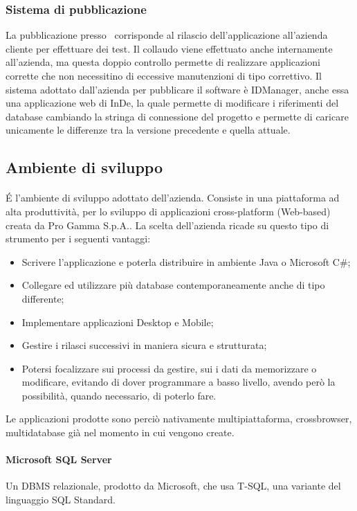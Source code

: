 \subsubsection{Sistema di pubblicazione}
La pubblicazione presso \azienda\ corrisponde al rilascio dell'applicazione all'azienda cliente per effettuare dei test. Il collaudo viene effettuato anche internamente all'azienda, ma questa doppio controllo permette di realizzare applicazioni corrette che non necessitino di eccessive manutenzioni di tipo correttivo. 
Il sistema adottato dall'azienda per pubblicare il software è IDManager, anche essa una applicazione web di InDe, la quale permette di modificare i riferimenti del database cambiando la stringa di connessione del progetto e permette di caricare unicamente le differenze tra la versione precedente e quella attuale.


\subsection{Ambiente di sviluppo}
\label{cap1:Ambiente di sviluppo}

\paragraph{\inde} \'E l'ambiente di sviluppo adottato dell'azienda. Consiste in una piattaforma ad alta produttività, per lo sviluppo di applicazioni cross-platform (Web-based) creata da Pro Gamma S.p.A.. La scelta dell'azienda ricade su questo tipo di strumento per i seguenti vantaggi:
\begin{itemize}
	\item Scrivere l'applicazione e poterla distribuire in ambiente Java o Microsoft C\#;
	\item Collegare ed utilizzare più database contemporaneamente anche di tipo differente;
	\item Implementare applicazioni Desktop e Mobile;
	\item Gestire i rilasci successivi in maniera sicura e strutturata;
	\item Potersi focalizzare sui processi da gestire, sui i dati da memorizzare o modificare, evitando di dover programmare a basso livello, avendo però la possibilità, quando necessario, di poterlo fare.
\end{itemize}
Le applicazioni prodotte sono perciò nativamente multipiattaforma, crossbrowser, multidatabase già nel momento in cui vengono create.

\paragraph{Microsoft SQL Server} Un DBMS relazionale, prodotto da Microsoft, che usa T-SQL, una variante del linguaggio SQL Standard. 

